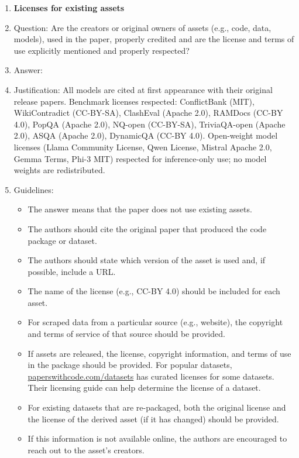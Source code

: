 \begin{enumerate}
\item \textbf{Licenses for existing assets}
    \item[] Question: Are the creators or original owners of assets (e.g., code, data, models), used in the paper, properly credited and are the license and terms of use explicitly mentioned and properly respected?
    \item[] Answer: \answerYes{}
    \item[] Justification: All models are cited at first appearance with their original release papers. Benchmark licenses respected: ConflictBank (MIT), WikiContradict (CC-BY-SA), ClashEval (Apache 2.0), RAMDocs (CC-BY 4.0), PopQA (Apache 2.0), NQ-open (CC-BY-SA), TriviaQA-open (Apache 2.0), ASQA (Apache 2.0), DynamicQA (CC-BY 4.0). Open-weight model licenses (Llama Community License, Qwen License, Mistral Apache 2.0, Gemma Terms, Phi-3 MIT) respected for inference-only use; no model weights are redistributed.
    \item[] Guidelines:
    \begin{itemize}
        \item The answer \answerNA{} means that the paper does not use existing assets.
        \item The authors should cite the original paper that produced the code package or dataset.
        \item The authors should state which version of the asset is used and, if possible, include a URL.
        \item The name of the license (e.g., CC-BY 4.0) should be included for each asset.
        \item For scraped data from a particular source (e.g., website), the copyright and terms of service of that source should be provided.
        \item If assets are released, the license, copyright information, and terms of use in the package should be provided. For popular datasets, \url{paperswithcode.com/datasets} has curated licenses for some datasets. Their licensing guide can help determine the license of a dataset.
        \item For existing datasets that are re-packaged, both the original license and the license of the derived asset (if it has changed) should be provided.
        \item If this information is not available online, the authors are encouraged to reach out to the asset's creators.
    \end{itemize}


\end{enumerate}
